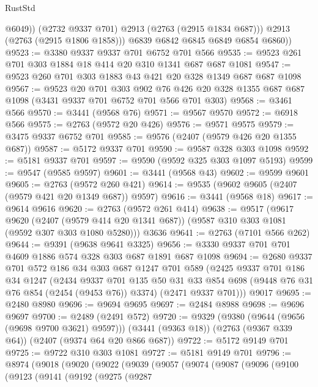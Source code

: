 \begin{lexlean}{RustStd}
\begin{coremodule}
                @6049))
            (@2732 @9337 @701)
            @2913
            (@2763 (@2915 @1834 @687)))
          @2913
          (@2763 (@2915 @1806 @1858)))
        @6839
        @6842
        @6845
        @6849
        @6854
        @6860))
@9523 := @3380 @9337 @9337 @701 @6752 @701 @566
@9535 := @9523 @261 @701 @303 @1884 @18 @414 @20 @310 @1341 @687 @687 @1081
@9547 := @9523 @260 @701 @303 @1883 @43 @421 @20 @328 @1349 @687 @687 @1098
@9567 := @9523
    @20
    @701
    @303
    @902
    @76
    @426
    @20
    @328
    @1355
    @687
    @687
    @1098
    (@3431 @9337 @701 @6752 @701 @566 @701 @303)
@9568 := @3461 @566
@9570 := @3441 (@9568 @76)
@9571 := @9567 @9570
@9572 := @6918 @566
@9575 := @2763 (@9572 @20 @426)
@9576 := @9571 @9575
@9579 := @3475 @9337 @6752 @701
@9585 := @9576 (@2407 (@9579 @426 @20 @1355 @687))
@9587 := @5172 @9337 @701
@9590 := @9587 @328 @303 @1098
@9592 := @5181 @9337 @701
@9597 := @9590 (@9592 @325 @303 @1097 @5193)
@9599 := @9547 (@9585 @9597)
@9601 := @3441 (@9568 @43)
@9602 := @9599 @9601
@9605 := @2763 (@9572 @260 @421)
@9614 := @9535 (@9602 @9605 (@2407 (@9579 @421 @20 @1349 @687)) @9597)
@9616 := @3441 (@9568 @18)
@9617 := @9614 @9616
@9620 := @2763 (@9572 @261 @414)
@9638 := @9517
    (@9617
      @9620
      (@2407 (@9579 @414 @20 @1341 @687))
      (@9587 @310 @303 @1081 (@9592 @307 @303 @1080 @5280)))
    @3636
@9641 := @2763 (@7101 @566 @262)
@9644 := @9391 (@9638 @9641 @3325)
@9656 := @3330 @9337 @701 @701 @4609 @1886 @574 @328 @303 @687 @1891 @687 @1098
@9694 := @2680
    @9337
    @701
    @572
    @186
    @34
    @303
    @687
    @1247
    @701
    @589
    (@2425
      @9337
      @701
      @186
      @34
      @1247
      (@2434
        @9337
        @701
        @135
        @50
        @31
        @33
        @854
        @698
        (@9448 @76 @31 @76 @854 (@2454 (@9453 @76)) @3374)
        (@2471 @9337 @701)))
    @9017
@9695 := @2480 @8980
@9696 := @9694 @9695
@9697 := @2484 @8988
@9698 := @9696 @9697
@9700 := @2489 (@2491 @572)
@9720 := @9329
    (@9380 (@9644 (@9656 (@9698 @9700 @3621) @9597)))
    (@3441 (@9363 @18))
    (@2763 (@9367 @339 @64))
    (@2407 (@9374 @64 @20 @866 @687))
@9722 := @5172 @9149 @701
@9725 := @9722 @310 @303 @1081
@9727 := @5181 @9149 @701
@9796 := @8974
    (@9018
      (@9020
        (@9022
          (@9039
            (@9057
              (@9074
                (@9087
                  (@9096
                    (@9100
                      (@9123
                        (@9141
                          (@9192
                            (@9275
                              (@9287

\end{coremodule}
\end{lexlean}
